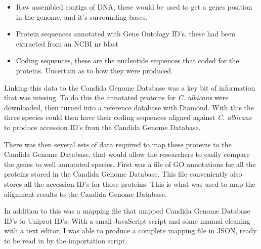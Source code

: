 \begin{itemize}
  \item Raw assembled contigs of DNA, these would be used to get a genes position in the genome, and it's surrounding bases. 
  \item Protein sequences annotated with Gene Ontology ID's, these had been extracted from an NCBI nr blast
  \item Coding sequences, these are the nucleotide sequences that coded for the proteins. Uncertain as to how they were produced.
\end{itemize}

Linking this data to the Candida Genome Database was a key bit of information that was missing. To do this the annotated proteins for \textit{C. albicans}\cite{http://www.candidagenome.org/download/sequence/C_albicans_SC5314/Assembly22/current/C_albicans_SC5314_A22_current_default_protein.fasta.gz} were downloaded, then turned into a reference database with Diamond. With this the three species could then have their coding sequences aligned against \textit{C. albicans} to produce accession ID's from the Candida Genome Database.

There was then several sets of data required to map these proteins to the Candida Genome Database, that would allow the researchers to easily compare the genes to well annotated species. First was a file of GO annotations for all the proteins stored in the Candida Genome Database. \cite{http://www.candidagenome.org/download/go/gene_association.cgd.gz} This file conveniently also stores all the accession ID's for those proteins. This is what was used to map the alignment results to the Candida Genome Database.

In addition to this was a mapping file that mapped Candida Genome Database ID's to Uniprot ID's. With a small JavaScript script and some manual cleaning with a text editor, I was able to produce a complete mapping file in JSON, ready to be read in by the importation script. 
